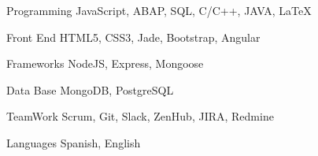 


\begin{cvskills}


\cvskill
{Programming} %
{JavaScript, ABAP, SQL, C/C++, JAVA, \LaTeX{}} %

\cvskill
{Front End} %
{HTML5, CSS3, Jade, Bootstrap, Angular} %

\cvskill
{Frameworks} %
{NodeJS, Express, Mongoose} %

\cvskill
{Data Base} %
{MongoDB, PostgreSQL} %

\cvskill
{TeamWork} %
{Scrum, Git, Slack, ZenHub, JIRA, Redmine} %

\cvskill
{Languages} %
{Spanish, English} %


\end{cvskills}
